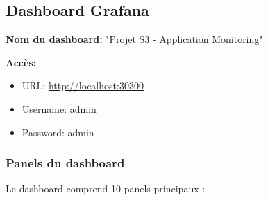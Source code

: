 \documentclass[12pt,a4paper]{article}
\begin{document}
\subsection{Dashboard Grafana}

\textbf{Nom du dashboard:} "Projet S3 - Application Monitoring"

\textbf{Accès:}
\begin{itemize}
    \item URL: \url{http://localhost:30300}
    \item Username: admin
    \item Password: admin
\end{itemize}

\subsubsection{Panels du dashboard}

Le dashboard comprend 10 panels principaux :
\end{document}
